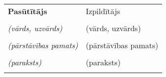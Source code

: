
\mbox{}\vfill %
\begin{tabu}{X X} \tabucline{}
	\rowfont[c]\bfseries Pasūtītājs & Izpildītājs \\
	[10pt]\makebox[8cm]{\hrulefill} & \makebox[8cm]{\hrulefill} \\
	\rowfont[c]\itshape (vārds, uzvārds) & (vārds, uzvārds) \\
	[10pt]\makebox[8cm]{\hrulefill} & \makebox[8cm]{\hrulefill} \\
	\rowfont[c]\itshape (pārstāvības pamats) & (pārstāvības pamats) \\
	[10pt]\makebox[8cm]{\hrulefill} & \makebox[8cm]{\hrulefill} \\
	\rowfont[c]\itshape (paraksts) & (paraksts) \\[4cm] \\
\end{tabu}
\pagebreak
